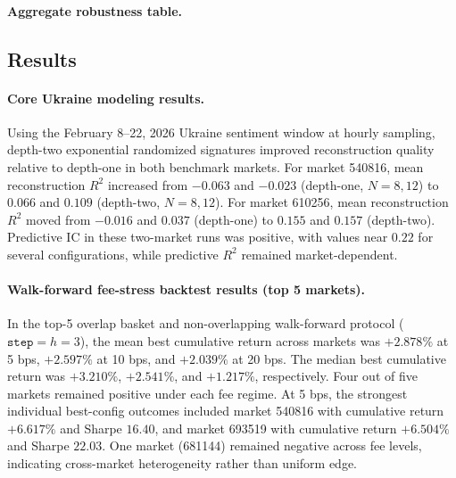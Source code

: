 \documentclass[11pt]{article}
\begin{document}
\paragraph{Aggregate robustness table.}

\subsection{Results}
\paragraph{Core Ukraine modeling results.}
Using the February 8--22, 2026 Ukraine sentiment window at hourly sampling, depth-two exponential randomized signatures improved reconstruction quality relative to depth-one in both benchmark markets. For market 540816, mean reconstruction \(R^2\) increased from \(-0.063\) and \(-0.023\) (depth-one, \(N=8,12\)) to \(0.066\) and \(0.109\) (depth-two, \(N=8,12\)). For market 610256, mean reconstruction \(R^2\) moved from \(-0.016\) and \(0.037\) (depth-one) to \(0.155\) and \(0.157\) (depth-two). Predictive IC in these two-market runs was positive, with values near \(0.22\) for several configurations, while predictive \(R^2\) remained market-dependent.

\paragraph{Walk-forward fee-stress backtest results (top 5 markets).}
In the top-5 overlap basket and non-overlapping walk-forward protocol (\(\texttt{step}=h=3\)), the mean best cumulative return across markets was \(+2.878\%\) at 5 bps, \(+2.597\%\) at 10 bps, and \(+2.039\%\) at 20 bps. The median best cumulative return was \(+3.210\%\), \(+2.541\%\), and \(+1.217\%\), respectively. Four out of five markets remained positive under each fee regime. At 5 bps, the strongest individual best-config outcomes included market 540816 with cumulative return \(+6.617\%\) and Sharpe \(16.40\), and market 693519 with cumulative return \(+6.504\%\) and Sharpe \(22.03\). One market (681144) remained negative across fee levels, indicating cross-market heterogeneity rather than uniform edge.
\end{document}
